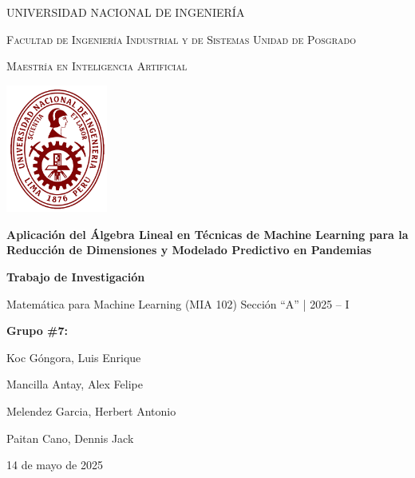 \documentclass[12pt]{article}
\begin{document}
        
        \begin{titlepage}
                \centering
                {\scshape\Large UNIVERSIDAD NACIONAL DE INGENIERÍA \par}
                {\scshape\large Facultad de Ingeniería Industrial y de Sistemas Unidad de Posgrado \par}
                {\scshape\large Maestría en Inteligencia Artificial \par}
                \vspace{2cm}
                
                \includegraphics[width=0.25\textwidth]{imagenes/logo.png}\par\vspace{1cm}
                
                {\Huge\bfseries Aplicación del Álgebra Lineal en Técnicas de Machine Learning para la Reducción de Dimensiones y Modelado Predictivo en Pandemias \par}
                \vspace{1.5cm}
                {\large\bfseries Trabajo de Investigación \par}
                \vspace{0.5cm}
                {\large Matemática para Machine Learning (MIA 102) Sección “A” | 2025 – I \par}
                \vspace{0.5cm}
                {\large\bfseries Grupo \#7: \par}
                \vspace{0.5cm}
                {\large Koc Góngora, Luis Enrique \par}
                {\large Mancilla Antay, Alex Felipe \par}
                {\large Melendez Garcia, Herbert Antonio \par}
                {\large Paitan Cano, Dennis Jack \par}
                \vfill
                {\large 14 de mayo de 2025 \par}
        \end{titlepage}
        
\end{document}
